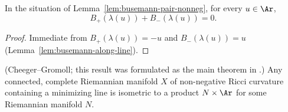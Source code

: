 \begin{corollary}
\label{cor:busemann-pair-vanishes-on-line}
\leanok
{}
In the situation of Lemma~\ref{lem:busemann-pair-nonneg}, for every
$u\in\Ar$,
$$B_+(\lambda(u))+B_-(\lambda(u))=0.$$
\end{corollary}

\begin{proof}
\leanok
{}
Immediate from $B_+(\lambda(u))=-u$ and $B_-(\lambda(u))=u$
(Lemma~\ref{lem:busemann-along-line}).
\end{proof}

\begin{lemma}
\label{lem:minimizing-line-implies-product}
\label{line}
(Cheeger--Gromoll; this result was formulated as the main theorem in
\cite{CheegerGromoll2}.)
Any connected, complete Riemannian manifold $X$ of non-negative Ricci
curvature containing a minimizing line is isometric to a product
$N\times \Ar$ for some Riemannian manifold $N$.
\end{lemma}

